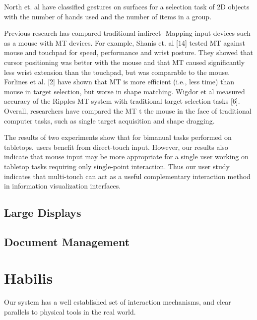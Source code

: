 \documentclass{article}
\begin{document}
\cite{North2009}
North et. al have classified gestures on surfaces for a selection task of 2D objects with the number of hands used and the number of items in a group.

\cite{Forlines2007}
Previous research has compared traditional indirect-
Mapping input devices such as a mouse with MT devices. For
example, Shanis et. al [14] tested MT against mouse and 
touchpad for speed, performance and wrist posture. They 
showed that cursor positioning was better with the mouse 
and that MT caused significantly less wrist extension than 
the touchpad, but was comparable to the mouse. Forlines et 
al. [2] have shown that MT is more efficient (i.e., less time) 
than mouse in target selection, but worse in shape 
matching. Wigdor et al measured accuracy of the Ripples 
MT system with traditional target selection tasks [6]. 
Overall, researchers have compared the MT t the mouse in 
the face of traditional computer tasks, such as single target 
acquisition and shape dragging.	

The results of two 
experiments show that for bimanual tasks performed on 
tabletops, users benefit from direct-touch input. However, 
our results also indicate that mouse input may be more 
appropriate for a single user working on tabletop tasks 
requiring only single-point interaction.
\cite{Kristensson2008}
Thus our user study indicates that multi-touch can act as a useful complementary interaction method in information visualization interfaces.



\subsection{Large Displays}
\cite{Darken1996}
\cite{Ball2007}
\cite{Czerwinski2003}
\subsection{Document Management}
\cite{Bier2005}
\cite{Foo2007:ICADL}
\cite{Mothe1998}
\cite{Newman2010}
\cite{Nowell1996}
\cite{schraefel2002}
\cite{Shneiderman2000}
\cite{Yost2006}

\section{Habilis}


Our system has a well established set of interaction mechanisms, and clear parallels to physical tools in the real world.
\end{document}
